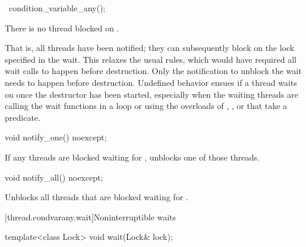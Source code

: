 %
\begin{itemdecl}
~condition_variable_any();
\end{itemdecl}

\begin{itemdescr}
\pnum
\expects
There is no thread blocked on .
\begin{note}
That is, all
threads have been notified; they can subsequently block on the lock specified in the
wait.
This relaxes the usual rules, which would have required all wait calls to happen before
destruction. Only the notification to unblock the wait needs to happen before destruction.
Undefined behavior ensues if a thread waits on  once the destructor has
been started, especially when the waiting threads are calling the wait functions in a loop or
using the overloads of , , or  that take a predicate.
\end{note}
\end{itemdescr}

%
\begin{itemdecl}
void notify_one() noexcept;
\end{itemdecl}

\begin{itemdescr}
\pnum
\effects
If any threads are blocked waiting for , unblocks one of those threads.
\end{itemdescr}

%
\begin{itemdecl}
void notify_all() noexcept;
\end{itemdecl}

\begin{itemdescr}
\pnum
\effects
Unblocks all threads that are blocked waiting for .
\end{itemdescr}

[thread.condvarany.wait]{Noninterruptible waits}

%
\begin{itemdecl}
template<class Lock>
  void wait(Lock& lock);
\end{itemdecl}


